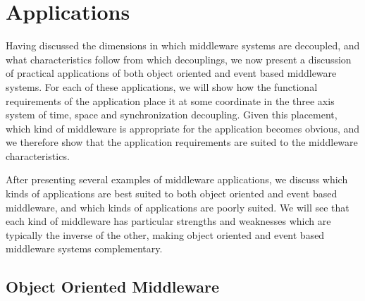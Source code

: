 \documentclass{acm_proc_article-sp}
\begin{document}
% 
% 
% 
% 
% 
% 
% 
% 



\section{Applications}
\label{sec:apps}

Having discussed the dimensions in which middleware systems are decoupled, and what characteristics follow from which decouplings, we now present a discussion of practical applications of both object oriented and event based middleware systems. For each of these applications, we will show how the functional requirements of the application place it at some coordinate in the three axis system of time, space and synchronization decoupling. Given this placement, which kind of middleware is appropriate for the application becomes obvious, and we therefore show that the application requirements are suited to the middleware characteristics. 

After presenting several examples of middleware applications, we discuss which kinds of applications are best suited to both object oriented and event based middleware, and which kinds of applications are poorly suited. We will see that each kind of middleware has particular strengths and weaknesses which are typically the inverse of the other, making object oriented and event based middleware systems complementary. 

\subsection{Object Oriented Middleware}
\label{sec:appsobj}
\end{document}
